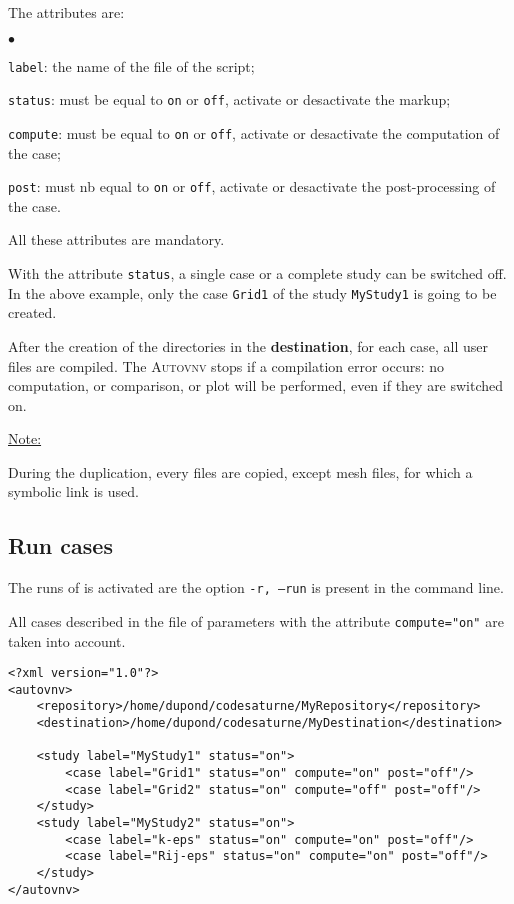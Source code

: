 \documentclass[a4paper,10pt,twoside]{article}
\begin{document}
The attributes are:
\begin{list}{$\bullet$}{}
\item \texttt{label}: the name of the file of the script;
\item \texttt{status}: must be equal to \texttt{on} or \texttt{off},
activate or desactivate the markup;
\item \texttt{compute}: must be equal to \texttt{on} or \texttt{off},
activate or desactivate the computation of the case;
\item \texttt{post}: must nb equal to \texttt{on} or \texttt{off},
activate or desactivate the post-processing of the case.
\end{list}

All these attributes are mandatory.

With the attribute \texttt{status}, a single case or a complete study can be switched off.
In the above example, only the case \texttt{Grid1} of the study \texttt{MyStudy1} is going
to be created.

After the creation of the directories in the \textbf{destination}, for each case, all user files
are compiled. The \textsc{Autovnv} stops if a compilation error occurs: no computation, or
comparison, or plot will be performed, even if they are switched on.

\underline{Note:}

During the duplication, every files are copied, except mesh files, for which a symbolic link is used.


\subsection{Run cases}

The runs of \CS is activated are the option \texttt{-r, --run} is present in the command line.

All cases described in the file of parameters with the attribute \texttt{compute="on"}
are taken into account.

\begin{verbatim}
<?xml version="1.0"?>
<autovnv>
    <repository>/home/dupond/codesaturne/MyRepository</repository>
    <destination>/home/dupond/codesaturne/MyDestination</destination>

    <study label="MyStudy1" status="on">
        <case label="Grid1" status="on" compute="on" post="off"/>
        <case label="Grid2" status="on" compute="off" post="off"/>
    </study>
    <study label="MyStudy2" status="on">
        <case label="k-eps" status="on" compute="on" post="off"/>
        <case label="Rij-eps" status="on" compute="on" post="off"/>
    </study>
</autovnv>
\end{verbatim}
\end{document}
